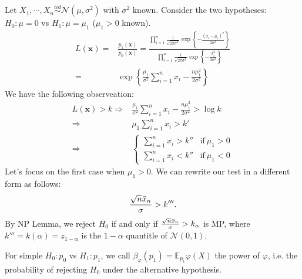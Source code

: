 \begin{example}
    Let $X_1,\cdots,X_n\overset{iid}{\sim}\mathcal{N}(\mu,\sigma^2)$ with $\sigma^2$ known.
    Consider the two hypotheses: $H_0:\mu=0$ vs $H_1:\mu=\mu_1$ ($\mu_1>0$ known).
    \begin{align}
        L(\boldsymbol{x})
        =& \frac{p_1(\boldsymbol{x})}{p_0(\boldsymbol{x})}
        = \frac{\prod_{i=1}^n\frac{1}{\sqrt{2\pi\sigma^2}}\exp\left\{-\frac{(x_i-\mu_1)^2}{2\sigma^2}\right\}}
        {\prod_{i=1}^n\frac{1}{\sqrt{2\pi\sigma^2}}\exp\left\{-\frac{x_i^2}{2\sigma^2}\right\}}\\
        =& \exp\left\{\frac{\mu_1}{\sigma^2}{\sum_{i=1}^n{x_i}}-\frac{n\mu_1^2}{2\sigma^2}\right\}
    \end{align}
    We have the following observeation:
    \begin{align}
        L(\boldsymbol{x})>k
        \Rightarrow& \frac{\mu_1}{\sigma^2}{\sum_{i=1}^n{x_i}}-\frac{n\mu_1^2}{2\sigma^2}>\log{k}\\
        \Rightarrow& \mu_1\sum_{i=1}^n{x_i}>k'\\
        \Rightarrow& \left\{\begin{array}{ll}
            \sum_{i=1}^n{x_i}>k'' & \text{if}~\mu_1>0 \\
            \sum_{i=1}^n{x_i}<k'' & \text{if}~\mu_1<0
        \end{array}\right.
    \end{align}
    Let's focus on the first case when $\mu_1>0$.
    We can rewrite our test in a different form as follows:
    \begin{gather}
        \frac{\sqrt{n}\Bar{x}_n}{\sigma}>k'''.
    \end{gather}
    By NP Lemma, we reject $H_0$ if and only if $\frac{\sqrt{n}\Bar{x}_n}{\sigma}>k_\alpha$ is MP,
    where $k'''=k(\alpha)=z_{1-\alpha}$ is the $1-\alpha$ quantitle of $\mathcal{N}(0,1)$.
\end{example}


\begin{definition}
    For simple $H_0:p_0$ vs $H_1:p_1$,
    we call $\beta_\varphi(p_1)=\mathbb{E}_{p_1}\varphi(X)$ the power of $\varphi$,
    i.e. the probability of rejecting $H_0$ under the alternative hypothesis.
\end{definition}

